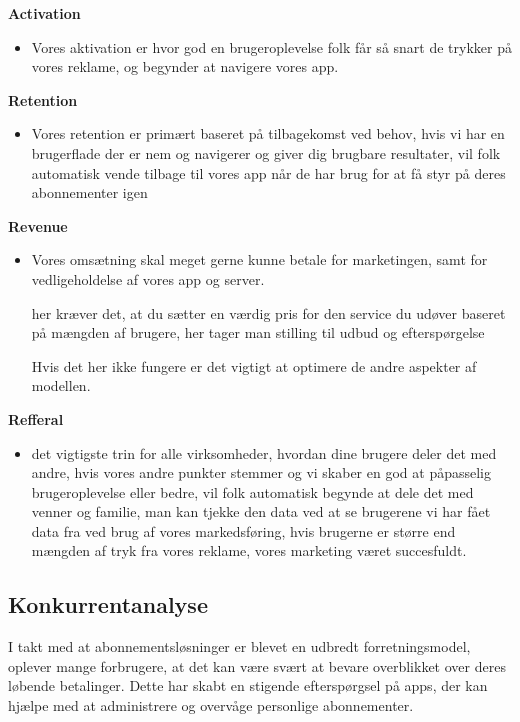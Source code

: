 \textbf{Activation}
\begin{itemize}
    \item Vores aktivation er hvor god en brugeroplevelse folk får så snart de trykker på vores reklame, og begynder at navigere vores app. 
\end{itemize}

\textbf{Retention}
\begin{itemize}
    \item Vores retention er primært baseret på tilbagekomst ved behov, hvis vi har en brugerflade der er nem og navigerer og giver dig brugbare resultater, vil folk automatisk vende tilbage til vores app når de har brug for at få styr på deres abonnementer igen 
\end{itemize}

\textbf{Revenue}
\begin{itemize}
    \item Vores omsætning skal meget gerne kunne betale for marketingen, samt for vedligeholdelse af vores app og server. 
    
    her kræver det, at du sætter en værdig pris for den service du udøver baseret på mængden af brugere, her tager man stilling til udbud og efterspørgelse 
    
    Hvis det her ikke fungere er det vigtigt at optimere de andre aspekter af modellen. 
\end{itemize}

\textbf{Refferal}
\begin{itemize}
    \item det vigtigste trin for alle virksomheder, hvordan dine brugere deler det med andre, hvis vores andre punkter stemmer og vi skaber en god at påpasselig brugeroplevelse eller bedre, vil folk automatisk begynde at dele det med venner og familie, man kan tjekke den data ved at se brugerene vi har fået data fra ved brug af vores markedsføring, hvis brugerne er større end mængden af tryk fra vores reklame, vores marketing været succesfuldt. 
\end{itemize}

\subsection{Konkurrentanalyse}
I takt med at abonnementsløsninger er blevet en udbredt forretningsmodel, oplever mange forbrugere, at det kan være svært at bevare overblikket over deres løbende betalinger. Dette har skabt en stigende efterspørgsel på apps, der kan hjælpe med at administrere og overvåge personlige abonnementer. 

